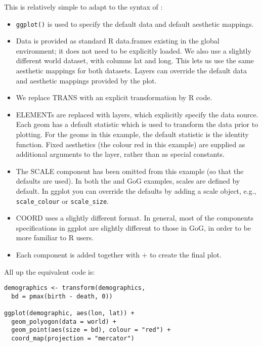 This is relatively simple to adapt to the syntax of \ggplot:

\begin{itemize}
  
  \item {\tt ggplot()} is used to specify the default data and default aesthetic mappings.
  
  \item Data is provided as standard R data.frames existing in the global environment; it does not need to be explicitly loaded.  We also use a slightly different world dataset, with columns lat and long.  This lets us use the same aesthetic mappings for both datasets. Layers can override the default data and aesthetic mappings provided by the plot. 
  
  \item We replace {\sf TRANS} with an explicit transformation by R code.

  \item {\sf ELEMENT}s are replaced with layers, which explicitly specify the data source.  Each geom has a default statistic which is used to transform the data prior to plotting.  For the geoms in this example, the default statistic is the identity function.  Fixed aesthetics (the colour red in this example) are supplied as additional arguments to the layer, rather than as special constants.

  \item The {\sf SCALE} component has been omitted from this example (so that the defaults are used).  In both the \ggplot and GoG examples, scales are defined by default.  In ggplot you can override the defaults by adding a scale object, e.g., {\tt scale\_colour} or {\tt scale\_size}.

  \item {\sf COORD} uses a slightly different format.  In general, most of the components specifications in ggplot are slightly different to those in GoG, in order to be more familiar to R users.

  \item Each component is added together with $+$ to create the final plot.

\end{itemize}

All up the equivalent \ggplot code is:

\begin{verbatim}
demographics <- transform(demographics, 
  bd = pmax(birth - death, 0))

ggplot(demographic, aes(lon, lat)) + 
  geom_polyogon(data = world) +
  geom_point(aes(size = bd), colour = "red") +
  coord_map(projection = "mercator")
\end{verbatim}

